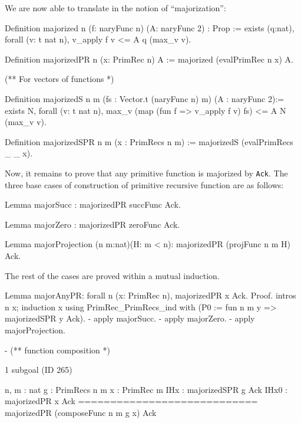 We are now able to translate in \gallina{} the notion of ``majorization'':

\begin{Coqsrc}
Definition majorized {n} (f: naryFunc n) (A: naryFunc 2) : Prop :=
  exists (q:nat), forall (v: t nat n),
      v_apply f v <= A q  (max_v v).

Definition majorizedPR {n} (x: PrimRec n) A := 
           majorized (evalPrimRec n x) A.

(** For vectors of functions *)

Definition majorizedS {n m} (fs : Vector.t (naryFunc n) m)
           (A : naryFunc 2):=
  exists N, forall (v: t nat n),
      max_v (map (fun f => v_apply f v) fs) <= A N (max_v v).

Definition majorizedSPR {n m} (x : PrimRecs n m) :=
  majorizedS (evalPrimRecs _ _ x).
\end{Coqsrc}

Now, it remains to prove that any primitive function is majorized by \texttt{Ack}.
The three base cases of construction of primitive recursive function are as follows:

\begin{Coqsrc}
Lemma majorSucc : majorizedPR  succFunc Ack.

Lemma majorZero : majorizedPR  zeroFunc Ack.

Lemma majorProjection (n m:nat)(H: m < n):
  majorizedPR (projFunc n m H) Ack.
\end{Coqsrc}


The rest of the cases are proved within a mutual  induction.


\begin{Coqsrc}
Lemma majorAnyPR:  forall n (x: PrimRec n),  majorizedPR  x Ack.
Proof.
  intros n x; induction x using PrimRec_PrimRecs_ind with
                  (P0 := fun n m y => majorizedSPR  y Ack).
  - apply majorSucc.
  - apply majorZero.
  - apply majorProjection. 
  \end{Coqsrc}

  \begin{Coqsrc}
  - (** function composition *)
\end{Coqsrc}
\begin{Coqanswer}
1 subgoal (ID 265)

  n, m : nat
  g : PrimRecs n m
  x : PrimRec m
  IHx : majorizedSPR g Ack
  IHx0 : majorizedPR x Ack
  ============================
  majorizedPR (composeFunc n m g x) Ack
\end{Coqanswer}

